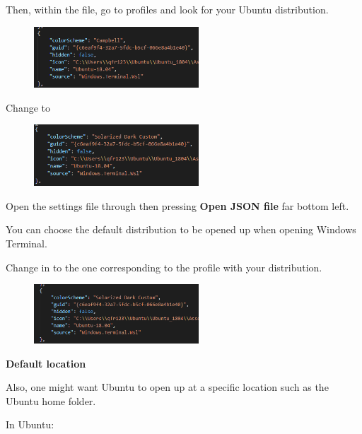 Then, within the  file, go to profiles and look for your Ubuntu distribution.

\begin{figure}[H]
    \includegraphics[width=0.55\textwidth]{figures/json_1.PNG}
\end{figure}

Change  to 

\begin{figure}[H]
    \includegraphics[width=0.55\textwidth]{figures/json_2.PNG}
\end{figure}


Open the settings  file through  then pressing \textbf{Open JSON file} far bottom left.

You can choose the default distribution to be opened up when opening Windows Terminal.

Change  in  to the one corresponding to the profile with your distribution.

\begin{figure}[H]
    \includegraphics[width=0.55\textwidth]{figures/json_3.PNG}
\end{figure}

\textbf{Default location}

Also, one might want Ubuntu to open up at a specific location such as the Ubuntu home folder.

In Ubuntu:



